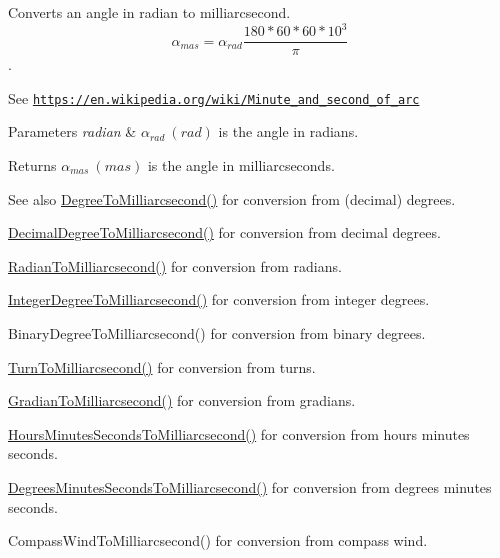 Converts an angle in radian to milliarcsecond. \[\alpha_{mas}=\alpha_{rad}\frac{180 * 60 * 60 * 10^3}{\pi}\]. 

See \href{https://en.wikipedia.org/wiki/Minute_and_second_of_arc}{\tt https\+://en.\+wikipedia.\+org/wiki/\+Minute\+\_\+and\+\_\+second\+\_\+of\+\_\+arc} 
\begin{DoxyParams}{Parameters}
{\em radian} & $\alpha_{rad}\ (rad)$ is the angle in radians. \\
\hline
\end{DoxyParams}
\begin{DoxyReturn}{Returns}
$\alpha_{mas}\ (mas)$ is the angle in milliarcseconds. 
\end{DoxyReturn}
\begin{DoxySeeAlso}{See also}
\mbox{\hyperlink{group___e_g_x_math-_angle_conversions-_degree_ga2c218e286b2ef72a00734dbc5a7f5ab6}{Degree\+To\+Milliarcsecond()}} for conversion from (decimal) degrees. 

\mbox{\hyperlink{group___e_g_x_math-_angle_conversions-_decimal_degree_gadb9ff3c92cf7484793f91e7de80c222e}{Decimal\+Degree\+To\+Milliarcsecond()}} for conversion from decimal degrees. 

\mbox{\hyperlink{group___e_g_x_math-_angle_conversions-_radian_ga84fbb494a455cfeb30be62776f96c9a9}{Radian\+To\+Milliarcsecond()}} for conversion from radians. 

\mbox{\hyperlink{group___e_g_x_math-_angle_conversions-_integer_degree_gadc43f22e832cd8fcf16b7bd2269ae348}{Integer\+Degree\+To\+Milliarcsecond()}} for conversion from integer degrees. 

Binary\+Degree\+To\+Milliarcsecond() for conversion from binary degrees. 

\mbox{\hyperlink{group___e_g_x_math-_angle_conversions-_turn_ga05d6fea8f8475831e93dd23f6196393f}{Turn\+To\+Milliarcsecond()}} for conversion from turns. 

\mbox{\hyperlink{group___e_g_x_math-_angle_conversions-_gradian_gad77ea0956413029f4166dce8d7f5ce83}{Gradian\+To\+Milliarcsecond()}} for conversion from gradians. 

\mbox{\hyperlink{group___e_g_x_math-_angle_conversions-_hours_minutes_seconds_gaf63c3ba5f75aacd268db2814575fa3f9}{Hours\+Minutes\+Seconds\+To\+Milliarcsecond()}} for conversion from hours minutes seconds. 

\mbox{\hyperlink{group___e_g_x_math-_angle_conversions-_degrees_minutes_seconds_gafc5f994dfc7cc26500ca978336484926}{Degrees\+Minutes\+Seconds\+To\+Milliarcsecond()}} for conversion from degrees minutes seconds. 

Compass\+Wind\+To\+Milliarcsecond() for conversion from compass wind. 
\end{DoxySeeAlso}
\mbox{\label{group___e_g_x_math-_angle_conversions-_radian_gaea391f0cca39b05e298dd1cae162e7f1}} 
